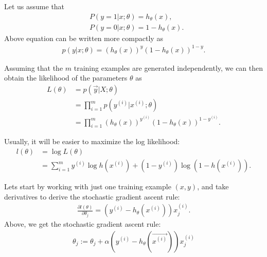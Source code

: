 \documentclass[10pt,onecolumn]{book}
\begin{document}
Let us assume that 
\begin{equation}
\begin{split}
& P(y = 1 | x;\theta) = h_\theta(x), \\
& P(y = 0 | x; \theta) = 1 - h_\theta(x).
\end{split}
\end{equation}
Above equation can be written more compactly as
\begin{equation}
\begin{split}
p(y|x;\theta) = (h_\theta(x)) ^y (1- h_\theta(x))^{1 - y}.
\end{split}
\end{equation}

Assuming that the $m$ training examples are generated independently, we can then obtain the likelihood of the parameters $\theta$ as
\begin{equation}
\begin{split}
L(\theta) &= p(\vec{y} | X; \theta) \\
			&= \prod_{i=1}^m p(y^{(i)} | x^{(i)}; \theta)\\
			&= \prod_{i=1}^m (h_\theta(x)) ^{y^{(i)}} (1- h_\theta(x))^{1 - y^{(i)}}.
\end{split}
\end{equation}

Usually, it will be easier to maximize the log likelihood:
\begin{equation}
\begin{split}
l(\theta) &= \log L(\theta) \\ 
		&= \sum_{i=1}^m y^{(i)} \log h(x^{(i)}) + (1 - y^{(i)}) \log (1 - h(x^{(i)})).
\end{split}
\end{equation}


Lets start by working with just one training example $(x, y)$, and take derivatives to derive the stochastic gradient ascent rule:
\begin{equation}
\begin{split}
\frac{\partial l(\theta)}{\partial \theta_j} = (y^{(i)} - h_\theta(x^{(i)})) x^{(i)}_j.
\end{split}
\end{equation}
Above, we get the stochastic gradient ascent rule:
\begin{equation}
\begin{split}
\theta_j := \theta_j + \alpha (y^{(i)} - h_\theta(\overrightarrow{{x^{(i)}}}))x^{(i)}_j
\end{split}
\end{equation}
\end{document}
